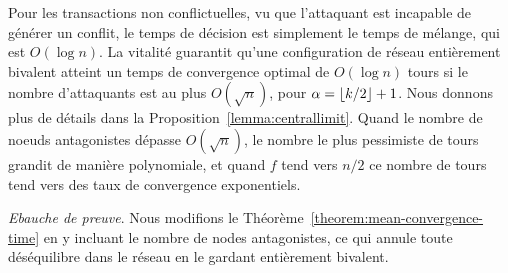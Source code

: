 \documentclass[letterpaper,twocolumn,10pt]{article}
\DeclarePairedDelimiter{\floor}{\lfloor}{\rfloor}
\newcommand{\Oh}[1]{O(#1)}
\theoremstyle{definition}
\begin{document}
Pour les transactions non conflictuelles, vu que l'attaquant est incapable de générer un conflit, le temps de décision
est simplement le temps de mélange, qui est $\Oh{\log{n}}$. La vitalité guarantit qu'une configuration de réseau
entièrement bivalent atteint un temps de convergence optimal de $\Oh{\log{n}}$ tours si le nombre d'attaquants est au
plus $\Oh{\sqrt{n}}$, pour $\alpha = \floor{k/2} + 1$. Nous donnons plus de détails dans la
Proposition~\ref{lemma:centrallimit}.
Quand le nombre de noeuds antagonistes dépasse $\Oh{\sqrt{n}}$, le nombre le plus pessimiste de tours grandit de manière
polynomiale, et quand $f$ tend vers $n/2$ ce nombre de tours tend vers des taux de convergence exponentiels.

\noindent \emph{Ebauche de preuve}. Nous modifions le Théorème~\ref{theorem:mean-convergence-time} en y incluant le
nombre de nodes antagonistes, ce qui annule toute déséquilibre dans le réseau en le gardant entièrement bivalent.
\end{document}
